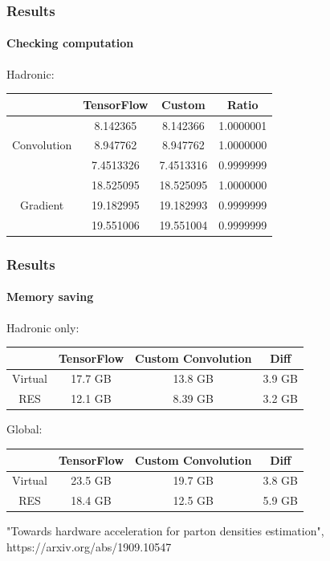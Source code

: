 \documentclass[aspectratio=43]{beamer}
\begin{document}
\begin{frame}
	
	\frametitle{Results}
	\framesubtitle{Checking computation}
	
	{\Large Hadronic:}
	\begin{table}
		\centering
		\begin{tabular}{c c c c}
			& TensorFlow & Custom & Ratio \\ \hline
			& 8.142365 & 8.142366 & {\color{darkgreen} 1.0000001} \\
			Convolution & 8.947762 & 8.947762 & {\color{darkgreen} 1.0000000} \\
			& 7.4513326 & 7.4513316 & {\color{darkgreen} 0.9999999} \\
			\hline
			& 18.525095 & 18.525095 & {\color{darkgreen} 1.0000000} \\
			Gradient & 19.182995 & 19.182993 & {\color{darkgreen} 0.9999999} \\
			& 19.551006 & 19.551004 & {\color{darkgreen} 0.9999999} \\
			\hline
		\end{tabular}
	\end{table}

\end{frame}

\begin{frame}

	\frametitle{Results}
	\framesubtitle{Memory saving}
	
	{\Large Hadronic only:}
	\begin{table}
		\centering
		\begin{tabular}{c c c c}
			& TensorFlow & Custom Convolution & Diff \\ \hline
			Virtual & {\color{red} 17.7 GB} & {\color{darkgreen} 13.8 GB} & {\color{darkgreen} 3.9 GB} \\
			RES & {\color{red} 12.1 GB} & {\color{darkgreen} 8.39 GB} & {\color{darkgreen} 3.2 GB} \\ \hline
		\end{tabular}
	\end{table}
	
	\hfill
	
	{\Large Global:}
	\begin{table}
		\centering
		\begin{tabular}{c c c c}
			& TensorFlow & Custom Convolution & Diff \\ \hline
			Virtual & {\color{red} 23.5 GB} & {\color{darkgreen} 19.7 GB} & {\color{darkgreen} 3.8 GB} \\
			RES & {\color{red} 18.4 GB} & {\color{darkgreen} 12.5 GB} & {\color{darkgreen} 5.9 GB} \\ \hline
		\end{tabular}
	\end{table}
	
	{\color{blue}"Towards hardware acceleration for parton densities estimation",\\ https://arxiv.org/abs/1909.10547}

\end{frame}
\end{document}
